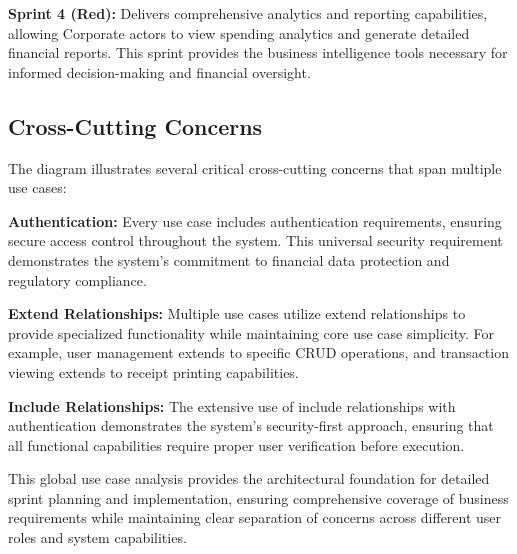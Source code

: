 \textbf{Sprint 4 (Red):} Delivers comprehensive analytics and reporting capabilities, allowing Corporate actors to view spending analytics and generate detailed financial reports. This sprint provides the business intelligence tools necessary for informed decision-making and financial oversight.

\subsection{Cross-Cutting Concerns}

The diagram illustrates several critical cross-cutting concerns that span multiple use cases:

\textbf{Authentication:} Every use case includes authentication requirements, ensuring secure access control throughout the system. This universal security requirement demonstrates the system's commitment to financial data protection and regulatory compliance.

\textbf{Extend Relationships:} Multiple use cases utilize extend relationships to provide specialized functionality while maintaining core use case simplicity. For example, user management extends to specific CRUD operations, and transaction viewing extends to receipt printing capabilities.

\textbf{Include Relationships:} The extensive use of include relationships with authentication demonstrates the system's security-first approach, ensuring that all functional capabilities require proper user verification before execution.

This global use case analysis provides the architectural foundation for detailed sprint planning and implementation, ensuring comprehensive coverage of business requirements while maintaining clear separation of concerns across different user roles and system capabilities.
